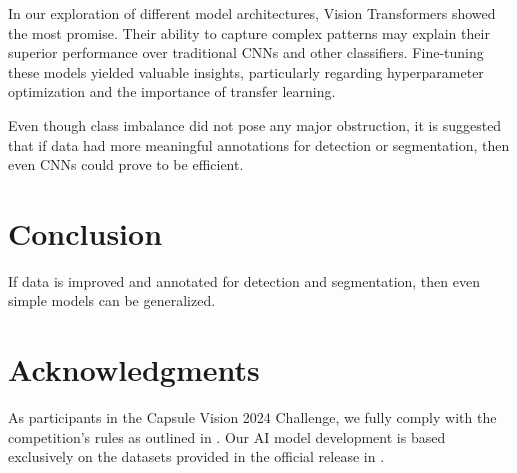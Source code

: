\documentclass[12pt]{article}
\begin{document}
In our exploration of different model architectures, Vision Transformers showed the most promise. Their ability to capture complex patterns may explain their superior performance over traditional CNNs and other classifiers. Fine-tuning these models yielded valuable insights, particularly regarding hyperparameter optimization and the importance of transfer learning.

Even though class imbalance did not pose any major obstruction, it is suggested that if data had more meaningful annotations for detection or segmentation, then even CNNs could prove to be efficient.

\section{Conclusion}\label{sec5}
If data is improved and annotated for detection and segmentation, then even simple models can be generalized.

\section{Acknowledgments}\label{sec6}
As participants in the Capsule Vision 2024 Challenge, we fully comply with the competition's rules as outlined in \cite{handa2024capsule}. Our AI model development is based exclusively on the datasets provided in the official release in \cite{Handa2024}.



\end{document}
